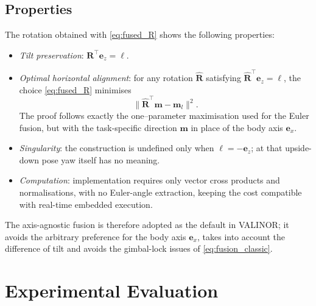 \documentclass{IJCAS}
\begin{document}
\subsection{Properties}

The rotation obtained with \eqref{eq:fused_R} shows the following
properties:

\begin{itemize}
  \item \emph{Tilt preservation}:  
        \(\boldsymbol{R}^{\top}\boldsymbol{e}_{z}=\boldsymbol{\ell}\).

  \item \emph{Optimal horizontal alignment}:  
        for any rotation \(\hat{\boldsymbol{R}}\) satisfying
        \(\hat{\boldsymbol{R}}^{\top}\boldsymbol{e}_{z}=\boldsymbol{\ell}\),
        the choice \eqref{eq:fused_R} minimises
        \[
          \bigl\|
             \hat{\boldsymbol{R}}^{\top}\boldsymbol{m}-\boldsymbol{m}_{l}
          \bigr\|^{2}.
        \]
        The proof follows exactly the one–parameter maximisation used
        for the Euler fusion, but with the task-specific direction
        \(\boldsymbol{m}\) in place of the body axis
        \(\boldsymbol{e}_{x}\).

  \item \emph{Singularity}:  
        the construction is undefined only when
        \(\boldsymbol{\ell}=-\boldsymbol{e}_{z}\); at that upside-down
        pose yaw itself has no meaning.

  \item \emph{Computation}:  
        implementation requires only vector cross products and
        normalisations, with no Euler-angle extraction, keeping the cost
        compatible with real-time embedded execution.
\end{itemize}

The axis-agnostic fusion is therefore adopted as the default in {\scshape VALINOR}; it avoids the arbitrary preference for the body axis \(\boldsymbol{e}_{x}\), takes into account the difference of tilt and avoids the gimbal-lock issues of \eqref{eq:fusion_classic}. 





\section{Experimental Evaluation}
\end{document}
